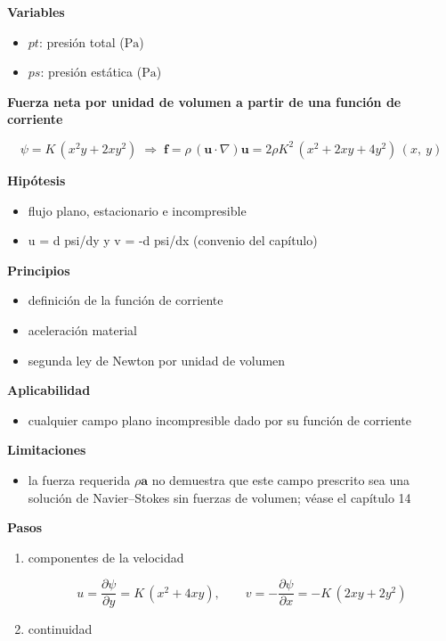 \documentclass[10pt,openany]{book}
\begin{document}
\begin{tcolorbox}[title={Desarrollos del modelo}, studiumdef, breakable]
\noindent\textbf{Variables}
\begin{itemize}
\item $pt$: presión total ($\mathrm{Pa}$)
\item $ps$: presión estática ($\mathrm{Pa}$)
\end{itemize}



\noindent\textbf{Fuerza neta por unidad de volumen a partir de una función de corriente}

\begin{equation}
\psi = K\,(x^{2}y + 2xy^{2}) \;\Rightarrow\; \mathbf{f} = \rho\,(\mathbf{u}\cdot\nabla)\mathbf{u} = 2\rho K^{2}\,(x^{2} + 2xy + 4y^{2})\,(x,\ y)
\label{eq:c12-psi-fuerza}
\end{equation}

\noindent\textbf{Hipótesis}
\begin{itemize}
\item flujo plano, estacionario e incompresible
\item u = d psi/dy y v = -d psi/dx (convenio del capítulo)
\end{itemize}

\noindent\textbf{Principios}
\begin{itemize}
\item definición de la función de corriente
\item aceleración material
\item segunda ley de Newton por unidad de volumen
\end{itemize}

\noindent\textbf{Aplicabilidad}
\begin{itemize}
\item cualquier campo plano incompresible dado por su función de corriente
\end{itemize}

\noindent\textbf{Limitaciones}
\begin{itemize}
\item la fuerza requerida \(\rho\mathbf{a}\) no demuestra que este campo prescrito sea una solución de Navier--Stokes sin fuerzas de volumen; véase el capítulo 14
\end{itemize}

\noindent\textbf{Pasos}
\begin{enumerate}
\item
componentes de la velocidad

\[
u = \frac{\partial\psi}{\partial y} = K\,(x^{2} + 4xy),\qquad v = -\frac{\partial\psi}{\partial x} = -K\,(2xy + 2y^{2})
\]
\item
continuidad


\end{enumerate}
\end{tcolorbox}
\end{document}
